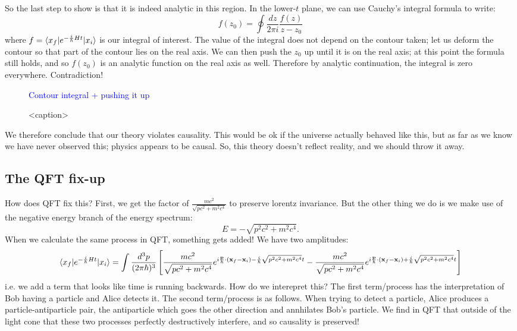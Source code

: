 So the last step to show is that it is indeed analytic in this region. In the lower-$t$ plane, we can use Cauchy's integral formula to write:
\begin{equation}
    f(z_0) = \oint \frac{dz}{2\pi i}\frac{f(z)}{z - z_0}
\end{equation}
where $f = \langle x_f \rvert e^{-\frac{i}{\hbar}Ht}\lvert x_i \rangle$ is our integral of interest. The value of the integral does not depend on the contour taken; let us deform the contour so that part of the contour lies on the real axis. We can then push the $z_0$ up until it is on the real axis; at this point the formula still holds, and so $f(z_0)$ is an analytic function on the real axis as well. Therefore by analytic continuation, the integral is zero everywhere. Contradiction!

\begin{figure}[htbp]
    \centering
    \textcolor{blue}{Contour integral + pushing it up}
    \caption{<caption>}
    \label{<label>}
\end{figure}

We therefore conclude that our theory violates causality. This would be ok if the universe actually behaved like this, but as far as we know we have never observed this; physics appears to be causal. So, this theory doesn't reflect reality, and we should throw it away.

\subsection{The QFT fix-up}

How does QFT fix this? First, we get the factor of $\frac{mc^2}{\sqrt{pc^2 + m^2c^4}}$ to preserve lorentz invariance. But the other thing we do is we make use of the negative energy branch of the energy spectrum:
\begin{equation}
    E = -\sqrt{p^2c^2 + m^2c^4}.
\end{equation}
When we calculate the same process in QFT, something gets added! We have two amplitudes:
\begin{equation}
    \langle x_f \rvert e^{-\frac{i}{\hbar}Ht}\lvert x_i \rangle = \int \frac{d^3p}{(2\pi\hbar)^3}\left[\frac{mc^2}{\sqrt{pc^2 + m^2c^4}}e^{i\frac{\mathbf{p}}{\hbar}\cdot(\mathbf{x}_f - \mathbf{x}_i) -\frac{i}{\hbar}\sqrt{p^2c^2 + m^2c^4}t} - \frac{mc^2}{\sqrt{pc^2 + m^2c^4}}e^{i\frac{\mathbf{p}}{\hbar}\cdot(\mathbf{x}_f - \mathbf{x}_i) +\frac{i}{\hbar}\sqrt{p^2c^2 + m^2c^4}t}\right]
\end{equation}
i.e. we add a term that looks like time is running backwards. How do we interepret this? The first term/process has the interpretation of Bob having a particle and Alice detects it. The second term/process is as follows. When trying to detect a particle, Alice produces a particle-antiparticle pair, the antiparticle which goes the other direction and annhilates Bob's particle. We find in QFT that outside of the light cone that these two processes perfectly destructively interfere, and so causality is preserved!

